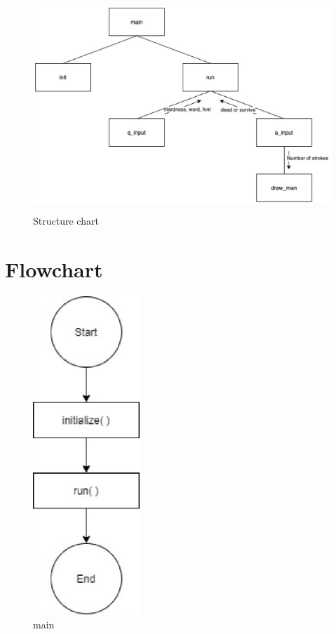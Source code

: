 \documentclass{article}
\begin{document}
        \begin{figure}[htbp]

            \centering
            \includegraphics[height = 8cm]{structure.eps}
            \caption{Structure chart}
            \label{structure_chart}
        \end{figure}

    \newpage

    \section{Flowchart}
        \begin{figure}[htbp]
            \centering
            \includegraphics[height = 12cm]{flowchart/main.eps}
            \caption{main}
        \end{figure}
\end{document}
